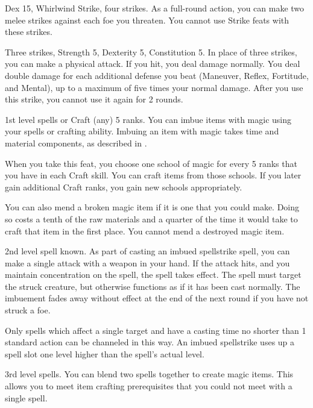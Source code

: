 \featpres Dex 15, Whirlwind Strike, four strikes.
\featben As a full-round action, you can make two melee strikes against each foe you threaten. You cannot use Strike feats with these strikes.

\featpre Three strikes, Strength 5, Dexterity 5, Constitution 5.
\featben In place of three strikes, you can make a physical attack.
If you hit, you deal damage normally.
You deal double damage for each additional defense you beat (Maneuver, Reflex, Fortitude, and Mental), up to a maximum of five times your normal damage.
After you use this strike, you cannot use it again for 2 rounds.

\featpre 1st level spells or Craft (any) 5 ranks.
\featben You can imbue items with magic using your spells or crafting ability.
Imbuing an item with magic takes time and material components, as described in .

When you take this feat, you choose one school of magic for every 5 ranks that you have in each Craft skill.
You can craft items from those schools.
If you later gain additional Craft ranks, you gain new schools appropriately.

You can also mend a broken magic item if it is one that you could make.
Doing so costs a tenth of the raw materials and a quarter of the time it would take to craft that item in the first place.
You cannot mend a destroyed magic item.

\featpre 2nd level spell known.
\featben As part of casting an imbued spellstrike spell, you can make a single attack with a weapon in your hand.
If the attack hits, and you maintain concentration on the spell, the spell takes effect.
The spell must target the struck creature, but otherwise functions as if it has been cast normally.
The imbuement fades away without effect at the end of the next round if you have not struck a foe.

Only spells which affect a single target and have a casting time no shorter than 1 standard action can be channeled in this way.
An imbued spellstrike uses up a spell slot one level higher than the spell's actual level.

\featpre 3rd level spells.
\featben You can blend two spells together to create magic items.
This allows you to meet item crafting prerequisites that you could not meet with a single spell.

